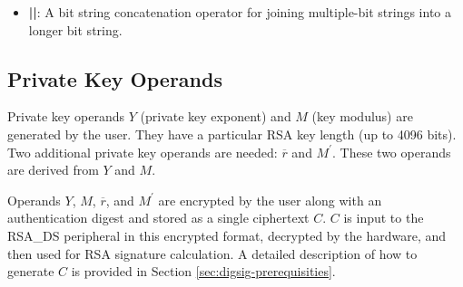 \documentclass[main\_\_EN.tex]{subfiles}
\begin{document}
\begin{itemize}
    \item {\bfseries ||}:
       A bit string concatenation operator for joining multiple-bit strings into a longer bit string.
\end{itemize}

\subsection{Private Key Operands}
\label{sec:digsig-private-key-operands}

Private key operands \begin{math}Y\end{math} (private key exponent) and \begin{math}M\end{math} (key modulus) are generated by the user. They have a particular RSA key length (up to 4096 bits).
Two additional private key operands are needed: \begin{math}\overline{r}\end{math} and \begin{math}M^{\prime}\end{math}. These two operands are derived from \begin{math}Y\end{math} and \begin{math}M\end{math}.

Operands \begin{math}Y\end{math}, \begin{math}M\end{math}, \begin{math}\overline{r}\end{math}, and \begin{math}M^{\prime}\end{math} are encrypted by the user along with an authentication digest and stored as a single ciphertext \begin{math}C\end{math}. \begin{math}C\end{math} is input to the RSA\_DS peripheral in this encrypted format, decrypted by the hardware, and then used for RSA signature calculation. A detailed description of how to generate \begin{math}C\end{math} is provided in Section \ref{sec:digsig-prerequisities}.
\end{document}
